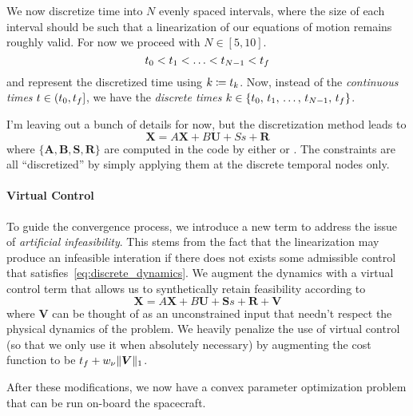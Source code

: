 \documentclass[12pt]{article}
\begin{document}
We now discretize time into $N$ evenly spaced intervals, where the size of each interval should be such that a linearization of our equations of motion remains roughly valid. For now we proceed with $N\in[5,10]$. 
\begin{equation}
t_0 < t_1 < \ldots < t_{N-1} < t_f
\end{equation}
and represent the discretized time using $k \coloneqq t_k$. Now, instead of the \textit{continuous times} $t\in(t_0,t_f]$, we have the \textit{discrete times} $k\in\{t_0,\,t_1,\,\ldots,\,t_{N-1},\,t_f\}$.

I'm leaving out a bunch of details for now, but the discretization method leads to
\begin{equation}
\bm{X} = A \bm{X} + B \bm{U} + S s + \bm{R}
\label{eq:discrete_dynamics}
\end{equation}
where $\{\bm{A},\bm{B},\bm{S},\bm{R}\}$ are computed in the code by either  or . The constraints are all ``discretized'' by simply applying them at the discrete temporal nodes only. 

\paragraph{Virtual Control}

To guide the convergence process, we introduce a new term to address the issue of \textit{artificial infeasibility}. This stems from the fact that the linearization may produce an infeasible interation if there does not exists some admissible control that satisfies~\eqref{eq:discrete_dynamics}. We augment the dynamics with a virtual control term that allows us to synthetically retain feasibility according to
\begin{equation}
\bm{X} = A \bm{X} + B \bm{U} + \bm{S} s + \bm{R} + \bm{V}
\label{eq:VC_discrete_dynamics}
\end{equation}
where $\bm{V}$ can be thought of as an unconstrained input that needn't respect the physical dynamics of the problem. We heavily penalize the use of virtual control (so that we only use it when absolutely necessary) by augmenting the cost function to be $t_f + w_{\nu} \| \bm{V} \|_1$.

After these modifications, we now have a convex parameter optimization problem that can be run on-board the spacecraft. 
\end{document}
